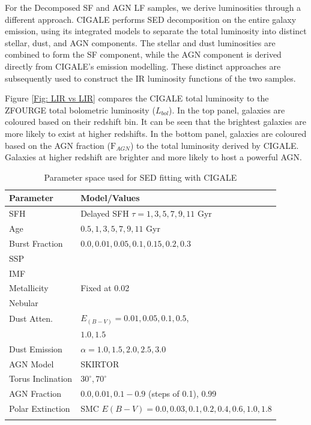 For the Decomposed SF and AGN LF samples, we derive luminosities through a different approach. CIGALE performs SED decomposition on the entire galaxy emission, using its integrated models to separate the total luminosity into distinct stellar, dust, and AGN components. The stellar and dust luminosities are combined to form the SF component, while the AGN component is derived directly from CIGALE's emission modelling. These distinct approaches are subsequently used to construct the IR luminosity functions of the two samples. 

Figure \ref{Fig: LIR vs LIR} compares the CIGALE total luminosity to the ZFOURGE total bolometric luminosity ($L_{bol}$). In the top panel, galaxies are coloured based on their redshift bin. It can be seen that the brightest galaxies are more likely to exist at higher redshifts. In the bottom panel, galaxies are coloured based on the AGN fraction ($\mathrm{F}_{AGN}$) to the total luminosity derived by CIGALE. Galaxies at higher redshift are brighter and more likely to host a powerful AGN.

\begin{table}[htbp]
    \caption{Parameter space used for SED fitting with CIGALE}
    \label{tab:parameter_space}
    \begin{center}
    \begin{tabular}{ll}
        \toprule
        \textbf{Parameter} & \textbf{Model/Values} \\ 
        \hline
        SFH                 & Delayed SFH $\tau = 1,3,5,7,9,11$ Gyr \\
        Age                 & $0.5, 1, 3, 5, 7, 9, 11$ Gyr \\
        Burst Fraction      & $0.0, 0.01, 0.05, 0.1, 0.15, 0.2, 0.3$ \\
        SSP                 & \cite{bruzual_stellar_2003} \\
        IMF                 & \cite{chabrier_galactic_2003} \\
        Metallicity         & Fixed at 0.02 \\
        Nebular             & \cite{inoue_rest-frame_2011} \\
        Dust Atten.         & \cite{calzetti_dust_2000} $E_{(B-V)} = 0.01, 0.05, 0.1, 0.5$, \\
                            & $1.0, 1.5$ \\
        Dust Emission       & \cite{dale_two-parameter_2014} $\alpha = 1.0, 1.5, 2.0, 2.5, 3.0$ \\
        AGN Model           & SKIRTOR \citep{stalevski_3d_2012, stalevski_dust_2016} \\
        Torus Inclination   & $30^\circ, 70^\circ$ \\
        AGN Fraction        & $0.0, 0.01, 0.1 - 0.9$ (steps of 0.1), 0.99 \\
        Polar Extinction    & SMC $E(B-V) = 0.0, 0.03, 0.1, 0.2, 0.4, 0.6, 1.0, 1.8$ \\
        \botrule
    \end{tabular}
    \end{center}
\end{table}


